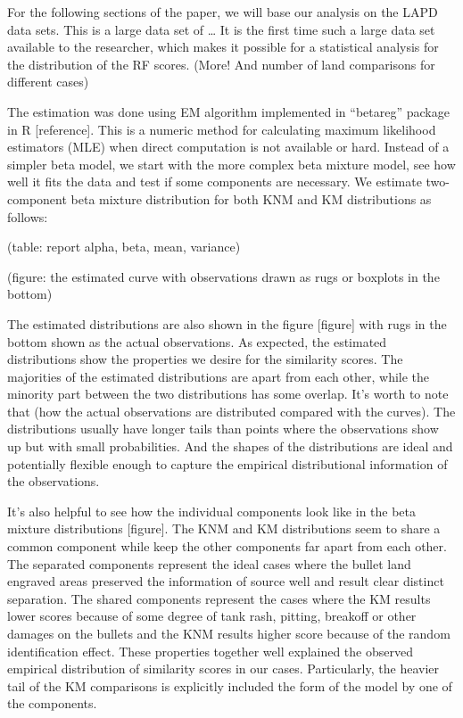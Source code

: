 \documentclass[]{elsarticle} %
\begin{document}
For the following sections of the paper, we will base our analysis on
the LAPD data sets. This is a large data set of \ldots{} It is the first
time such a large data set available to the researcher, which makes it
possible for a statistical analysis for the distribution of the RF
scores. (More! And number of land comparisons for different cases)

The estimation was done using EM algorithm implemented in ``betareg''
package in R {[}reference{]}. This is a numeric method for calculating
maximum likelihood estimators (MLE) when direct computation is not
available or hard. Instead of a simpler beta model, we start with the
more complex beta mixture model, see how well it fits the data and test
if some components are necessary. We estimate two-component beta mixture
distribution for both KNM and KM distributions as follows:

(table: report alpha, beta, mean, variance)

(figure: the estimated curve with observations drawn as rugs or boxplots
in the bottom)

The estimated distributions are also shown in the figure {[}figure{]}
with rugs in the bottom shown as the actual observations. As expected,
the estimated distributions show the properties we desire for the
similarity scores. The majorities of the estimated distributions are
apart from each other, while the minority part between the two
distributions has some overlap. It's worth to note that (how the actual
observations are distributed compared with the curves). The
distributions usually have longer tails than points where the
observations show up but with small probabilities. And the shapes of the
distributions are ideal and potentially flexible enough to capture the
empirical distributional information of the observations.

It's also helpful to see how the individual components look like in the
beta mixture distributions {[}figure{]}. The KNM and KM distributions
seem to share a common component while keep the other components far
apart from each other. The separated components represent the ideal
cases where the bullet land engraved areas preserved the information of
source well and result clear distinct separation. The shared components
represent the cases where the KM results lower scores because of some
degree of tank rash, pitting, breakoff or other damages on the bullets
and the KNM results higher score because of the random identification
effect. These properties together well explained the observed empirical
distribution of similarity scores in our cases. Particularly, the
heavier tail of the KM comparisons is explicitly included the form of
the model by one of the components.
\end{document}
